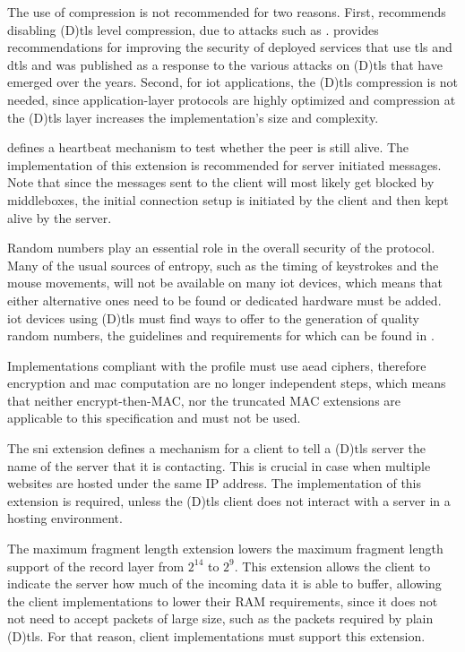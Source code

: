 \documentclass{llncs}
\begin{document}
{The use of compression is not recommended for two reasons. First, \cite{RFC7525}
recommends disabling (D)\gls{tls} level compression, due to attacks such as \cite{Microsof72:online}.
 provides recommendations for improving the security of deployed services
that use \gls{tls} and \gls{dtls} and was published as a response to the various
attacks on (D)\gls{tls} that have emerged over the years. Second, for \gls{iot} applications,
the (D)\gls{tls} compression is not needed, since application-layer protocols are highly
optimized and compression at the (D)\gls{tls} layer increases the implementation's size and complexity.

\cite{RFC6520} defines a heartbeat mechanism to test whether the peer
is still alive. The implementation of this extension is recommended for server
initiated messages. Note that since the messages sent to the client will most likely
get blocked by middleboxes, the initial connection setup is initiated by the
client and then kept alive by the server.

Random numbers play an essential role in the overall security of the protocol.
Many of the usual sources of entropy, such as the timing of keystrokes and the
mouse movements, will not be available on many \gls{iot} devices, which means that
either alternative ones need to be found or dedicated hardware must be added.
\gls{iot} devices using (D)\gls{tls} must find ways to offer to the generation of quality
random numbers, the guidelines and requirements for which can be found in \cite{rfc4086}.

Implementations compliant with the profile must use \gls{aead} ciphers, therefore
encryption and \gls{mac} computation are no longer independent steps, which means
that neither encrypt-then-MAC\cite{RFC7366}, nor the truncated MAC\cite{RFC6066} extensions are applicable
to this specification and must not be used.

The \gls{sni} extension\cite{RFC6066} defines a mechanism for a client to
tell a (D)\gls{tls} server the name of the server that it is contacting. This is
crucial in case when multiple websites are hosted under the same IP address.
The implementation of this extension is required, unless the (D)\gls{tls}
client does not interact with a server in a hosting environment.

The maximum fragment length extension\cite{RFC6066} lowers the maximum fragment
length support of the record layer from $2^14$ to $2^9$. This extension allows
the client to indicate the server how much of the incoming data it is able to buffer,
allowing the client implementations to lower their RAM requirements, since it does not
not need to accept packets of large size, such as the  packets required by
plain (D)\gls{tls}. For that reason, client implementations must support this
extension.

}
\end{document}
